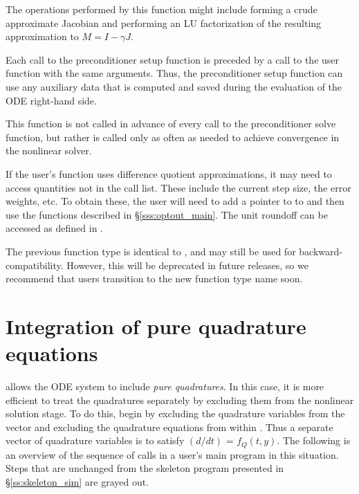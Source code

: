 {
  The operations performed by this function might include forming a crude
  approximate Jacobian and performing an LU factorization of the resulting
  approximation to $M=I - \gamma J$.

  Each call to the preconditioner setup function is preceded by a call to
  the  user function with the same  arguments.
  Thus, the preconditioner setup function can use any auxiliary data that is
  computed and saved during the evaluation of the ODE right-hand side.

  This function is not called in advance of every call to the preconditioner
  solve function, but rather is called only as often as needed to achieve
  convergence in the nonlinear solver.

  If the user's  function uses difference quotient
  approximations, it may need to access quantities not in the call
  list. These include the current step size, the error weights, etc.
  To obtain these, the user will need to add a pointer to 
  to  and then use the  functions described in
  \S\ref{sss:optout_main}. The unit roundoff can be accessed as
   defined in .

  The previous function type  is identical to
  , and may still be used for backward-compatibility.
  However, this will be deprecated in future releases, so we recommend
  that users transition to the new function type name soon.
}

\section{Integration of pure quadrature equations}
{\cvodes} allows the ODE system to include {\em pure quadratures}.  In
this case, it is more efficient to treat the quadratures separately by
excluding them from the nonlinear solution stage.  To do this, begin
by excluding the quadrature variables from the vector  and
excluding the quadrature equations from within .  Thus a
separate vector  of quadrature variables is to satisfy
$(d/dt)$ = $f_Q(t,y)$.  The following is an overview of the
sequence of calls in a user's main program in this situation. Steps
that are unchanged from the skeleton program presented in
\S\ref{ss:skeleton_sim} are grayed out.

